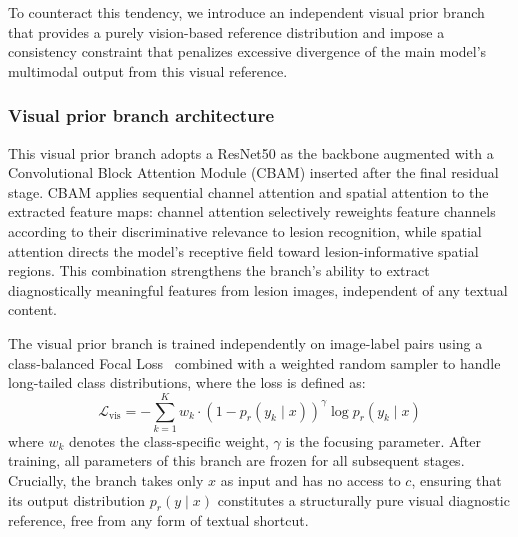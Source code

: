 \documentclass[preprint,12pt]{elsarticle}
\makeatletter
\def@NAT@last@yr{--\NAT@penalty}%
\makeatother
\begin{document}
To counteract this tendency, we introduce an independent visual prior branch that provides a purely vision-based reference distribution and impose a consistency constraint that penalizes excessive divergence of the main model's multimodal output from this visual reference.

\subsubsection{Visual prior branch architecture}
This visual prior branch adopts a ResNet50 as the backbone augmented with a Convolutional Block Attention
Module (CBAM) \cite{woo2018cbam} inserted after the final residual stage. CBAM applies sequential channel attention and spatial attention to the extracted feature maps: channel attention selectively reweights feature channels according to their discriminative relevance to lesion recognition, while spatial attention directs the model's receptive field toward lesion-informative spatial regions. This combination strengthens the branch's ability to extract diagnostically meaningful features from lesion images, independent of any textual content. 


The visual prior branch is trained independently on image-label pairs using a class-balanced Focal Loss~\cite{lin2017focal} combined with a weighted random sampler to handle long-tailed class distributions, where the loss is defined as:
\begin{equation}
	\mathcal{L}_{\text{vis}} = -\sum_{k=1}^{K} w_k \cdot (1 - p_r(y_k \mid x))^{\gamma} \log p_r(y_k \mid x) 
\end{equation}
where $w_k$ denotes the class-specific weight, $\gamma$ is the focusing parameter. After training, all parameters of this branch are frozen for all subsequent stages. Crucially, the branch takes only $x$ as input and has no access to $c$, ensuring that its output distribution $p_r(y \mid x)$ constitutes a structurally pure visual diagnostic reference, free from any form of textual shortcut.
\end{document}
